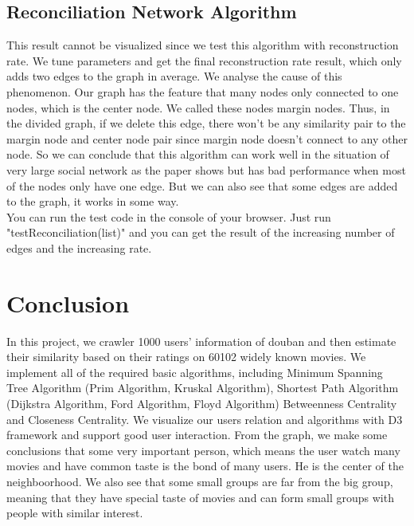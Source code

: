 \documentclass{article}
\begin{document}
\subsection{Reconciliation Network Algorithm}
This result cannot be visualized since we test this algorithm with reconstruction rate. We tune parameters and get the final reconstruction rate result, which only adds two edges to the graph in average. We analyse the cause of this phenomenon. Our graph has the feature that many nodes only connected to one nodes, which is the center node. We called these nodes margin nodes. Thus, in the divided graph, if we delete this edge, there won't be any similarity pair to the margin node and center node pair since margin node doesn't connect to any other node. So we can conclude that this algorithm can work well in the situation of very large social network as the paper shows but has bad performance when most of the nodes only have one edge. But we can also see that some edges are added to the graph, it works in some way.\\
You can run the test code in the console of your browser. Just run "testReconciliation(list)" and you can get the result of the increasing number of edges and the increasing rate.\\
 
\section{Conclusion}
In this project, we crawler 1000 users' information of douban and then estimate their similarity based on their ratings on 60102 widely known movies. We implement all of the required basic algorithms, including Minimum Spanning Tree Algorithm (Prim Algorithm, Kruskal Algorithm), Shortest Path Algorithm (Dijkstra Algorithm, Ford Algorithm, Floyd Algorithm) Betweenness Centrality and Closeness Centrality. We visualize our users relation and algorithms with D3 framework and support good user interaction. From the graph, we make some conclusions that some very important person, which means the user watch many movies and have common taste is the bond of many users. He is the center of the neighboorhood. We also see that some small groups are far from the big group, meaning that they have special taste of movies and can form small groups with people with similar interest.

\begin{small}

 
\end{small}

\medskip
\end{document}
